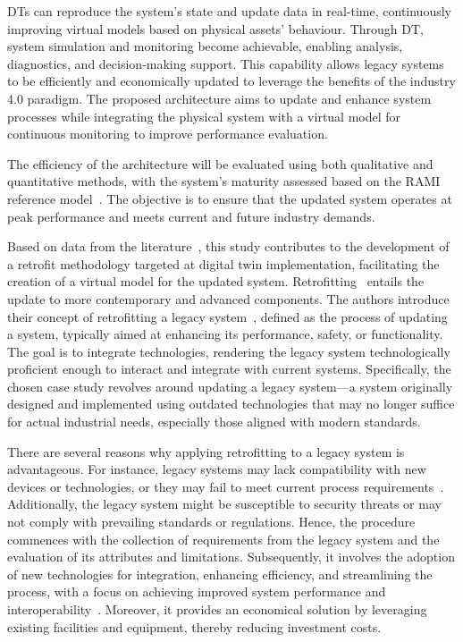 \documentclass[journal]{IEEEtran}
\begin{document}
DTs can reproduce the system’s state and update data in real-time, continuously improving virtual models based on physical assets' behaviour. Through DT, system simulation and monitoring become achievable, enabling analysis, diagnostics, and decision-making support. This capability allows legacy systems to be efficiently and economically updated to leverage the benefits of the industry 4.0 paradigm. The proposed architecture aims to update and enhance system processes while integrating the physical system with a virtual model for continuous monitoring to improve performance evaluation.

The efficiency of the architecture will be evaluated using both qualitative and quantitative methods, with the system’s maturity assessed based on the RAMI reference model~\cite{Bastos2021, Alemao2022, Lopez2023}. The objective is to ensure that the updated system operates at peak performance and meets current and future industry demands.

Based on data from the literature~\cite{Ooi2020, Mendonca2023}, this study contributes to the development of a retrofit methodology targeted at digital twin implementation, facilitating the creation of a virtual model for the updated system. Retrofitting~\cite{Tran2022, Li2024} entails the update to more contemporary and advanced components. The authors introduce their concept of retrofitting a legacy system~\cite{Carrillo2023}, defined as the process of updating a system, typically aimed at enhancing its performance, safety, or functionality. The goal is to integrate technologies, rendering the legacy system technologically proficient enough to interact and integrate with current systems. Specifically, the chosen case study revolves around updating a legacy system—a system originally designed and implemented using outdated technologies that may no longer suffice for actual industrial needs, especially those aligned with modern standards.

There are several reasons why applying retrofitting to a legacy system is advantageous. For instance, legacy systems may lack compatibility with new devices or technologies, or they may fail to meet current process requirements~\cite{annett2019}. Additionally, the legacy system might be susceptible to security threats or may not comply with prevailing standards or regulations. Hence, the procedure commences with the collection of requirements from the legacy system and the evaluation of its attributes and limitations. Subsequently, it involves the adoption of new technologies for integration, enhancing efficiency, and streamlining the process, with a focus on achieving improved system performance and interoperability~\cite{gao2019}. Moreover, it provides an economical solution by leveraging existing facilities and equipment, thereby reducing investment costs.
\end{document}
